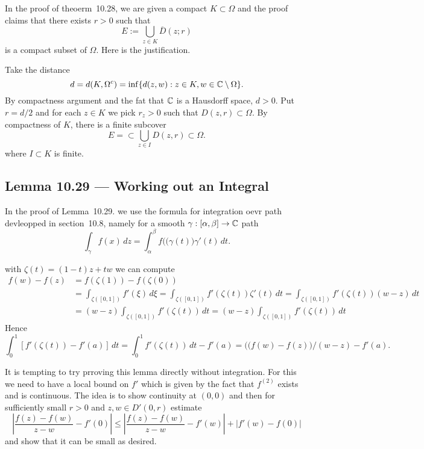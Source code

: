 In the proof of theoerm~10.28, we are given a compact \(K \subset \Omega\)
and the proof claims that there exists \(r>0\) such that
\begin{equation*}
E := \bigcup_{z\in K} \overline{D}(z;r)
\end{equation*}
is a compact subset of \(\Omega\).
Here is the justification.

Take the distance 
\begin{equation*}
d=d(K,\Omega^c)=\inf\{d(z,w):z\in K, w\in \mathbb{C}\setminus\Omega\}.
\end{equation*}
By compactness argument and the fat that \(\mathbb{C}\) is a Hausdorff space, \(d>0\).
Put \(r=d/2\) and
for each \(z\in K\) we pick \(r_z>0\) such that \(D(z,r) \subset \Omega\).
By compactness of $K$, there is a finite subcover
\begin{equation*}
E = \subset \bigcup_{z\in I} D(z,r) \subset \Omega.
\end{equation*}
where \(I\subset K\) is finite.


\subsection{Lemma 10.29 --- Working out an Integral}

In the proof of Lemma~10.29.
we use the formula for integration oevr path devleopped
in section~10.8, namely for a smooth \(\gamma:[\alpha,\beta]\to\mathbb{C}\) path
\begin{equation*}
\int_\gamma f(x)\,dz = \int_\alpha^\beta f(\bigl(\gamma(t)\bigr)\gamma'(t)\,dt.
\end{equation*}

with \(\zeta(t) = (1-t)z+tw\) we can compute
\begin{align*}
f(w) - f(z)
&= f(\zeta(1)) - f(\zeta(0)) \\
&= \int_{\zeta([0,1])} f'(\xi)\,d\xi
 = \int_{\zeta([0,1])} f'(\zeta(t))\zeta'(t)\,dt
 = \int_{\zeta([0,1])} f'(\zeta(t))(w-z)\,dt \\
&= (w-z)\int_{\zeta([0,1])} f'(\zeta(t))\,dt
 = (w-z)\int_{\zeta([0,1])} f'(\zeta(t))\,dt
\end{align*}
Hence
\begin{equation*}
\int_0^1 \left[f'(\zeta(t)) - f'(a)\right]\,dt
= \int_0^1 f'(\zeta(t))\,dt - f'(a)
= \bigl((f(w) - f(z)\bigr)/(w-z) - f'(a).
\end{equation*}

It is tempting to try prroving this lemma directly without integration.
For this we need to have a local bound on \(f'\) which is given
by the fact that \(f^{(2)}\) exists and is continuous.
The idea is to show continuity at \((0,0)\) and then for sufficiently small
\(r>0\) and \(z,w\in D'(0,r)\) estimate
\begin{equation*}
\left|\frac{f(z)-f(w)}{z-w} - f'(0)\right|
\leq \left|\frac{f(z)-f(w)}{z-w} - f'(w)\right| + |f'(w) - f(0)|
\end{equation*}
and show that it can be small as desired.

